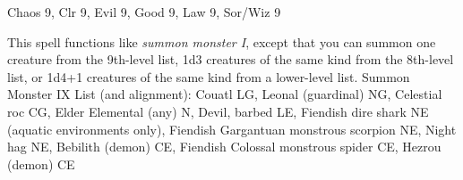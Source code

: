 
\begin{description*}
\item[Level:] Chaos 9, Clr 9, Evil 9, Good 9, Law 9, Sor/Wiz 9
\end{description*}

This spell functions like \textit{summon monster I}, except that you can summon
one creature from the 9th-level list, 1d3 creatures of the same kind from the 8th-level
list, or 1d4+1 creatures of the same kind from a lower-level list.
Summon Monster IX List (and alignment): Couatl LG, Leonal (guardinal) NG, Celestial roc CG, Elder Elemental (any) N, Devil, barbed LE, Fiendish dire shark NE (aquatic environments only), Fiendish Gargantuan monstrous scorpion NE, Night hag NE, Bebilith (demon) CE, Fiendish Colossal monstrous spider CE, Hezrou (demon) CE